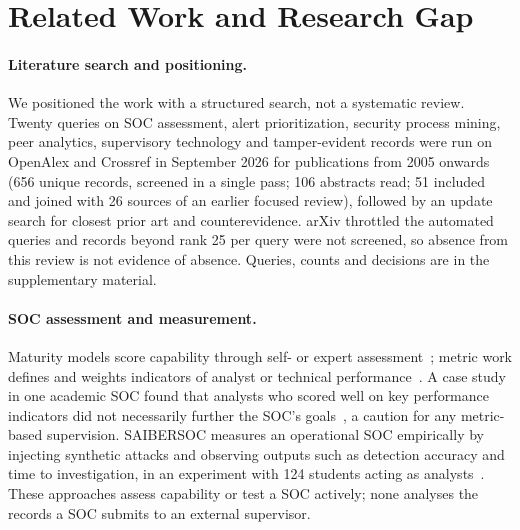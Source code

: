 \section{Related Work and Research Gap}
\label{sec:related}

\paragraph{Literature search and positioning.} We positioned the work with a
structured search, not a systematic review. Twenty queries on SOC assessment, alert prioritization, security
process mining, peer analytics, supervisory technology and tamper-evident records
were run on OpenAlex and Crossref in September 2026 for publications from 2005
onwards (656 unique records, screened in a single pass; 106 abstracts
read; 51 included and joined with 26 sources of an earlier focused review), followed
by an update search for closest prior art and counterevidence. arXiv throttled the
automated queries and records beyond rank 25 per query were not screened, so absence
from this review is not evidence of absence. Queries, counts and decisions are in
the supplementary material.

\paragraph{SOC assessment and measurement.} Maturity models score capability through
self- or expert assessment~\cite{vanos2016soccmm,schlette2021ctisoc2m2}; metric
work defines and weights indicators of analyst or technical
performance~\cite{agyepong2019review,agyepong2023analyst,forsberg2023metrics}.
A case study in one academic SOC found that analysts who scored well on key
performance indicators did not necessarily further the SOC's goals~\cite{morin2025mismatched},
a caution for any metric-based supervision. SAIBERSOC measures an operational SOC
empirically by injecting synthetic attacks and observing outputs such as detection
accuracy and time to investigation, in an experiment with 124 students acting as
analysts~\cite{rosso2020saibersoc}. These approaches assess capability or test a SOC
actively; none analyses the records a SOC submits to an external supervisor.


